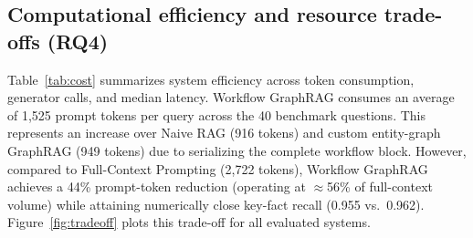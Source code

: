 \documentclass[preprint,10pt]{elsarticle}
\begin{document}
\subsection{Computational efficiency and resource trade-offs (RQ4)}
Table~\ref{tab:cost} summarizes system efficiency across token consumption, generator calls, and median latency. Workflow GraphRAG consumes an average of 1,525 prompt tokens per query across the 40 benchmark questions. This represents an increase over Naive RAG (916 tokens) and custom entity-graph GraphRAG (949 tokens) due to serializing the complete workflow block. However, compared to Full-Context Prompting (2,722 tokens), Workflow GraphRAG achieves a 44\% prompt-token reduction (operating at $\approx$56\% of full-context volume) while attaining numerically close key-fact recall (0.955 vs.\ 0.962).
Figure~\ref{fig:tradeoff} plots this trade-off for all evaluated systems.
\end{document}
